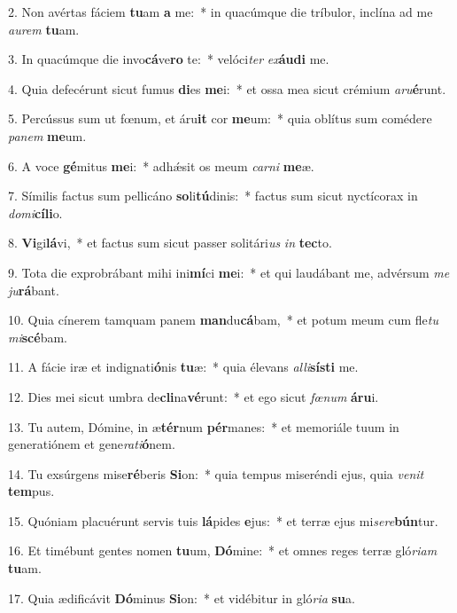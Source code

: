 2. Non avértas fáciem \textbf{tu}am \textbf{a} me:~*  in quacúmque die tríbulor, inclína ad me \textit{au}\textit{rem} \textbf{tu}am.\

3. In quacúmque die invo\textbf{cá}ve\textbf{ro} te:~*  velóci\textit{ter} \textit{ex}\textbf{áu}\textbf{di} me.\

4. Quia defecérunt sicut fumus \textbf{di}es \textbf{me}i:~*  et ossa mea sicut crémium \textit{a}\textit{ru}\textbf{é}runt.\

5. Percússus sum ut fœnum, et áru\textbf{it} cor \textbf{me}um:~*  quia oblítus sum comédere \textit{pa}\textit{nem} \textbf{me}um.\

6. A voce \textbf{gé}mitus \textbf{me}i:~*  adhǽsit os meum \textit{car}\textit{ni} \textbf{me}æ.\

7. Símilis factus sum pellicáno \textbf{so}li\textbf{tú}dinis:~*  factus sum sicut nyctícorax in \textit{do}\textit{mi}\textbf{cí}\textbf{li}o.\

8. \textbf{Vi}gi\textbf{lá}vi,~*  et factus sum sicut passer solitári\textit{us} \textit{in} \textbf{tec}to.\

9. Tota die exprobrábant mihi ini\textbf{mí}ci \textbf{me}i:~*  et qui laudábant me, advérsum \textit{me} \textit{ju}\textbf{rá}bant.\

10. Quia cínerem tamquam panem \textbf{man}du\textbf{cá}bam,~*  et potum meum cum fle\textit{tu} \textit{mi}\textbf{scé}bam.\

11. A fácie iræ et indignati\textbf{ó}nis \textbf{tu}æ:~*  quia élevans \textit{al}\textit{li}\textbf{sís}\textbf{ti} me.\

12. Dies mei sicut umbra de\textbf{cli}na\textbf{vé}runt:~*  et ego sicut \textit{fœ}\textit{num} \textbf{á}\textbf{ru}i.\

13. Tu autem, Dómine, in æ\textbf{tér}num \textbf{pér}manes:~*  et memoriále tuum in generatiónem et gene\textit{ra}\textit{ti}\textbf{ó}nem.\

14. Tu exsúrgens mise\textbf{ré}beris \textbf{Si}on:~*  quia tempus miseréndi ejus, quia \textit{ve}\textit{nit} \textbf{tem}pus.\

15. Quóniam placuérunt servis tuis \textbf{lá}pides \textbf{e}jus:~*  et terræ ejus mi\textit{se}\textit{re}\textbf{bún}tur.\

16. Et timébunt gentes nomen \textbf{tu}um, \textbf{Dó}mine:~*  et omnes reges terræ gló\textit{ri}\textit{am} \textbf{tu}am.\

17. Quia ædificávit \textbf{Dó}minus \textbf{Si}on:~*  et vidébitur in gló\textit{ri}\textit{a} \textbf{su}a.\

